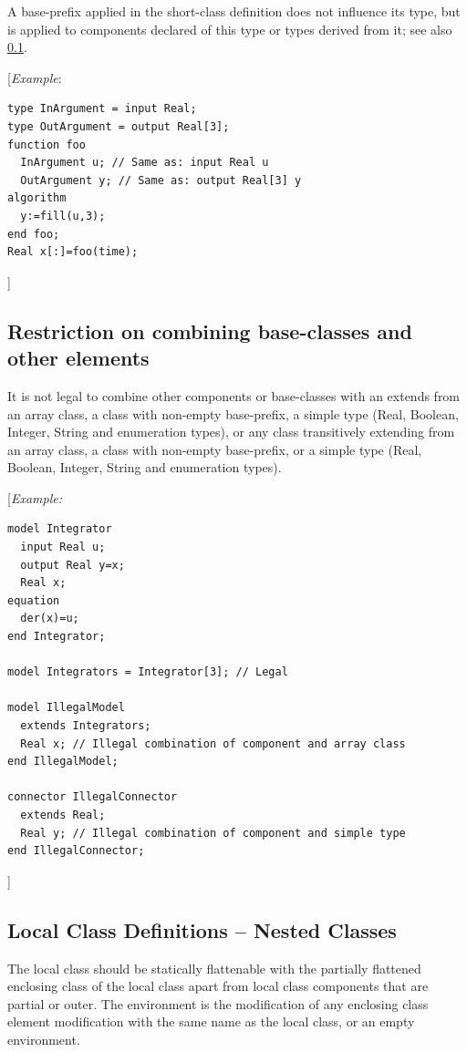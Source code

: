 \documentclass[10pt,a4paper]{report}
\def\doublelabel#1{\label{#1}\hypertarget{#1}{}}
\begin{document}
A base-prefix applied in the short-class definition does not influence
its type, but is applied to components declared of this type or types
derived from it; see also \ref{restriction-on-combining-base-classes-and-other-elements}.

{[}\emph{Example}:
\begin{lstlisting}[language=modelica]
type InArgument = input Real;
type OutArgument = output Real[3];
function foo
  InArgument u; // Same as: input Real u
  OutArgument y; // Same as: output Real[3] y
algorithm
  y:=fill(u,3);
end foo;
Real x[:]=foo(time);
\end{lstlisting}

{]}

\subsection{Restriction on combining base-classes and other elements}\doublelabel{restriction-on-combining-base-classes-and-other-elements}

It is not legal to combine other components or base-classes with an
extends from an array class, a class with non-empty base-prefix, a
simple type (Real, Boolean, Integer, String and enumeration types), or
any class transitively extending from an array class, a class with
non-empty base-prefix, or a simple type (Real, Boolean, Integer, String
and enumeration types).

{[}\emph{Example:}
\begin{lstlisting}[language=modelica]
model Integrator
  input Real u;
  output Real y=x;
  Real x;
equation
  der(x)=u;
end Integrator;

model Integrators = Integrator[3]; // Legal

model IllegalModel
  extends Integrators;
  Real x; // Illegal combination of component and array class 
end IllegalModel;

connector IllegalConnector
  extends Real;
  Real y; // Illegal combination of component and simple type
end IllegalConnector;
\end{lstlisting}

{]}

\subsection{Local Class Definitions -- Nested Classes}\doublelabel{local-class-definitions-nested-classes}

The local class should be statically flattenable with the partially
flattened enclosing class of the local class apart from local class
components that are partial or outer. The environment is the
modification of any enclosing class element modification with the same
name as the local class, or an empty environment.
\end{document}
